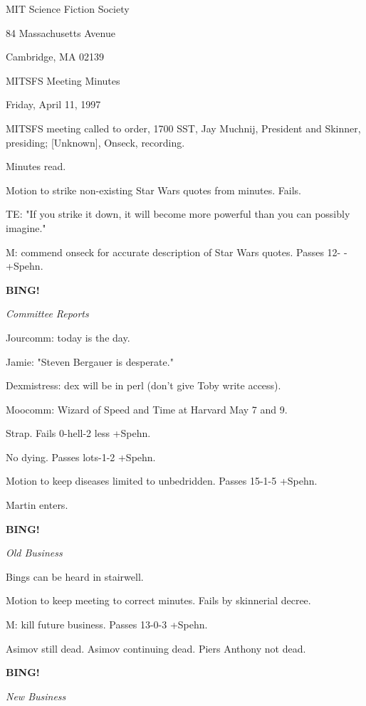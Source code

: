 \documentclass[12pt]{article}
\newcommand{\bing}{{\bf BING!} }
\newcommand{\goto}[1]{\bing \vskip 12pt \centerline{{\em{#1}}}}
\begin{document}
\begin{center}

MIT Science Fiction Society 

84 Massachusetts Avenue

Cambridge, MA 02139

\vspace{12pt}

MITSFS Meeting Minutes 

Friday, April 11, 1997

\end{center}
 
\vspace{18pt}

\setlength{\parskip}{6pt}

\noindent
MITSFS meeting called to order, 1700 SST,
Jay Muchnij, President and Skinner, presiding; [Unknown], Onseck, recording.

Minutes read.

Motion to strike non-existing Star Wars quotes from minutes. Fails.

TE: "If you strike it down, it will become more powerful than you can possibly imagine."

M: commend onseck for accurate description of Star Wars quotes. Passes 12- -  +Spehn.

\goto{Committee Reports}

Jourcomm: today is the day.

Jamie: "Steven Bergauer is desperate."

Dexmistress: dex will be in perl (don't give Toby write access).

Moocomm: Wizard of Speed and Time at Harvard May 7 and 9.

Strap. Fails 0-hell-2 less +Spehn.

No dying. Passes lots-1-2 +Spehn.

Motion to keep diseases limited to unbedridden. Passes 15-1-5 +Spehn.

Martin enters.

\goto{Old Business}

Bings can be heard in stairwell.

Motion to keep meeting to correct minutes. Fails by skinnerial decree.

M: kill future business. Passes 13-0-3 +Spehn.

Asimov still dead. Asimov continuing dead. Piers Anthony not dead.

\goto{New Business}
\end{document}
